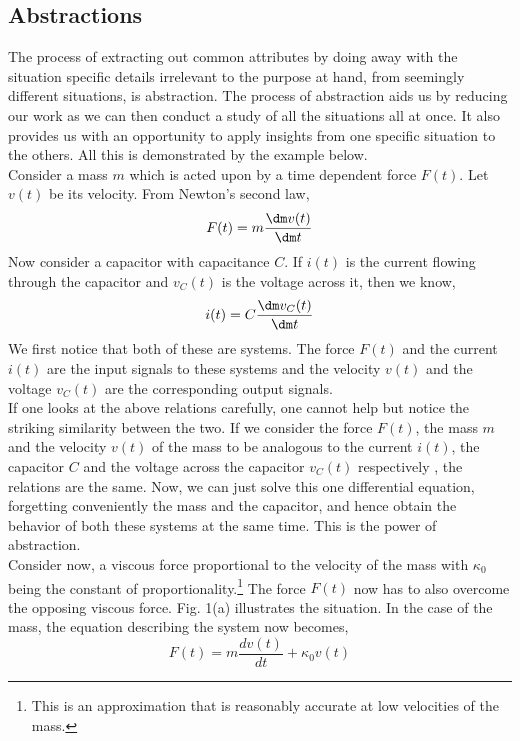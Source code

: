 \subsection{Abstractions}
    The process of extracting out common attributes by doing away with the situation specific details irrelevant to the purpose at hand, from seemingly different situations, is abstraction. The process of abstraction aids us by reducing our work as we can then conduct a study of all the situations all at once. It also provides us with an opportunity to apply insights from one specific situation to the others. All this is demonstrated by the example below.\\
    Consider a mass $m$ which is acted upon by a time dependent force $F(t)$. Let $v(t)$ be its velocity. From Newton's second law,
    \begin{equation}
        F(t) = m\frac{\dm v(t)}{\dm t}
    \end{equation}
    Now consider a capacitor with capacitance $C$. If $i(t)$ is the current flowing through the capacitor and $v_{C}(t)$ is the voltage across it, then we know,
    \begin{equation}
        i(t) = C\frac{\dm v_{C}(t)}{\dm t}    
    \end{equation}
    We first notice that both of these are systems. The force $F(t)$ and the current $i(t)$ are the input signals to these systems and the velocity $v(t)$ and the voltage $v_{C}(t)$ are the corresponding output signals.\\
    If one looks at the above relations carefully, one cannot help
    but notice the striking similarity between the two. If we consider the
    force $F(t)$, the mass $m$ and the velocity $v(t)$ of the mass to be
    analogous to the current $i(t)$, the capacitor $C$ and the voltage
    across the capacitor $v_{C}(t)$ respectively , the relations are the same. Now, we can just solve this one differential equation, forgetting conveniently the mass and the capacitor, and hence obtain the behavior of both these systems at the same time. This is the power of abstraction.\\

    Consider now, a viscous force proportional to the velocity of the mass with $\kappa_{0}$ being the constant of proportionality.\footnote{This is an approximation that is reasonably accurate at low velocities of the mass.} The force $F(t)$ now has to also overcome the opposing viscous force. Fig. 1(a) illustrates the situation. In the case of the mass, the equation describing the system now becomes,
    \[
    F(t) = m\frac{dv(t)}{dt} + \kappa_{0}v(t)
    \]

